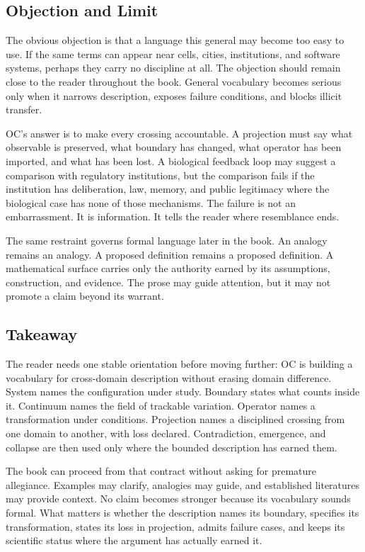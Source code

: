 \documentclass[11pt,a4paper,openany]{book}
\begin{document}
\subsection{Objection and Limit}
The obvious objection is that a language this general may become too easy to use. If the same terms can appear near cells, cities, institutions, and software systems, perhaps they carry no discipline at all. The objection should remain close to the reader throughout the book. General vocabulary becomes serious only when it narrows description, exposes failure conditions, and blocks illicit transfer. \cite{kauffman_autocatalytic,raf_networks}\par
OC's answer is to make every crossing accountable. A projection must say what observable is preserved, what boundary has changed, what operator has been imported, and what has been lost. A biological feedback loop may suggest a comparison with regulatory institutions, but the comparison fails if the institution has deliberation, law, memory, and public legitimacy where the biological case has none of those mechanisms. The failure is not an embarrassment. It is information. It tells the reader where resemblance ends.\par
The same restraint governs formal language later in the book. An analogy remains an analogy. A proposed definition remains a proposed definition. A mathematical surface carries only the authority earned by its assumptions, construction, and evidence. The prose may guide attention, but it may not promote a claim beyond its warrant.\par
\subsection{Takeaway}
The reader needs one stable orientation before moving further: OC is building a vocabulary for cross-domain description without erasing domain difference. System names the configuration under study. Boundary states what counts inside it. Continuum names the field of trackable variation. Operator names a transformation under conditions. Projection names a disciplined crossing from one domain to another, with loss declared. Contradiction, emergence, and collapse are then used only where the bounded description has earned them. \cite{kauffman_autocatalytic,raf_networks}\par
The book can proceed from that contract without asking for premature allegiance. Examples may clarify, analogies may guide, and established literatures may provide context. No claim becomes stronger because its vocabulary sounds formal. What matters is whether the description names its boundary, specifies its transformation, states its loss in projection, admits failure cases, and keeps its scientific status where the argument has actually earned it.\par
\end{document}
